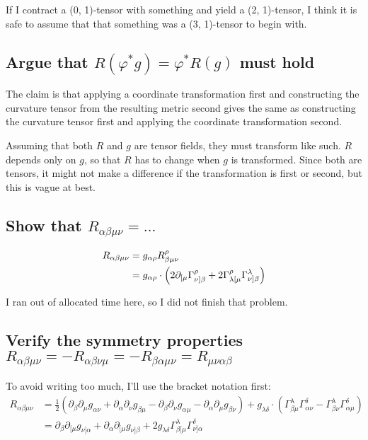 If I contract a (0, 1)-tensor with something and yield a (2, 1)-tensor, I think
it is safe to assume that that something was a (3, 1)-tensor to begin with.

\subsection{Argue that $R(\varphi^*g) = \varphi^* R(g)$ must hold}

The claim is that applying a coordinate transformation first and
constructing the curvature tensor from the resulting metric second gives the
same as constructing the curvature tensor first and applying the coordinate
transformation second.

Assuming that both $R$ and $g$ are tensor fields, they must transform like
such. $R$ depends only on $g$, so that $R$ has to change when $g$ is
transformed. Since both are tensors, it might not make a difference if the
transformation is first or second, but this is vague at best.

\subsection{Show that $R_{\alpha\beta\mu\nu} = \ldots$}

\begin{align*}
    R_{\alpha\beta\mu\nu}
    &= g_{\alpha\rho} R^\rho_{\beta\mu\nu} \\
    &= g_{\alpha\rho} \cdot \del{2 \partial_{[\mu} \Gamma^\rho_{\nu]\beta} + 2
    \Gamma^\rho_{\lambda[\mu} \Gamma^\lambda_{\nu]\beta}}
\end{align*}

I ran out of allocated time here, so I did not finish that problem.

\subsection{Verify the symmetry properties $R_{\alpha\beta\mu\nu} = -
R_{\alpha\beta\nu\mu} = - R_{\beta\alpha\mu\nu} = R_{\mu\nu\alpha\beta}$}

To avoid writing too much, I'll use the bracket notation first:
\begin{align*}
    R_{\alpha\beta\mu\nu}
    &= \frac 12 (\partial_\beta \partial_\mu g_{\alpha\nu} + \partial_\alpha
    \partial_\nu g_{\beta\mu} - \partial_\beta \partial_\nu g_{\alpha\mu} -
    \partial_\alpha \partial_\mu g_{\beta\nu})
    + g_{\lambda\delta} \cdot (
    \Gamma^\lambda_{\beta\mu} \Gamma^\delta_{\alpha\nu}
    - \Gamma^\lambda_{\beta\nu} \Gamma^\delta_{\alpha\mu}
    ) \\
    &= \partial_\beta \partial_{[\mu} g_{\nu]\alpha}
    + \partial_\alpha \partial_{[\mu} g_{\nu]\beta}
    + 2 g_{\lambda\delta} \Gamma^\lambda_{\beta[\mu} \Gamma^\delta_{\nu]\alpha}
\end{align*}

